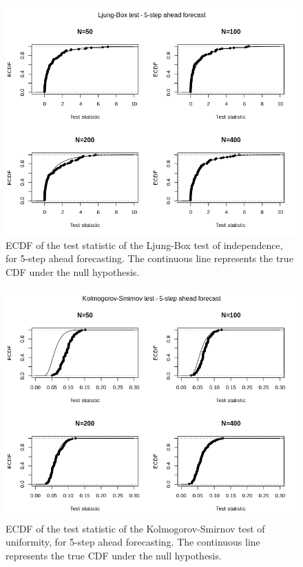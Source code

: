 \documentclass{article}
\begin{document}
\begin{figure}[ht]
\centering
\includegraphics[width=14cm]{LB-5.png}
\caption{ECDF of the test statistic of the Ljung-Box test of independence, for 5-step ahead forecasting. The continuous line represents the true CDF under the null hypothesis.}
\label{fig:LB-5}
\end{figure}

\begin{figure}[ht]
\centering
\includegraphics[width=14cm]{KS-5.png}
\caption{ECDF of the test statistic of the Kolmogorov-Smirnov test of uniformity, for 5-step ahead forecasting. The continuous line represents the true CDF under the null hypothesis.}
\label{fig:KS-5}
\end{figure}
\end{document}
